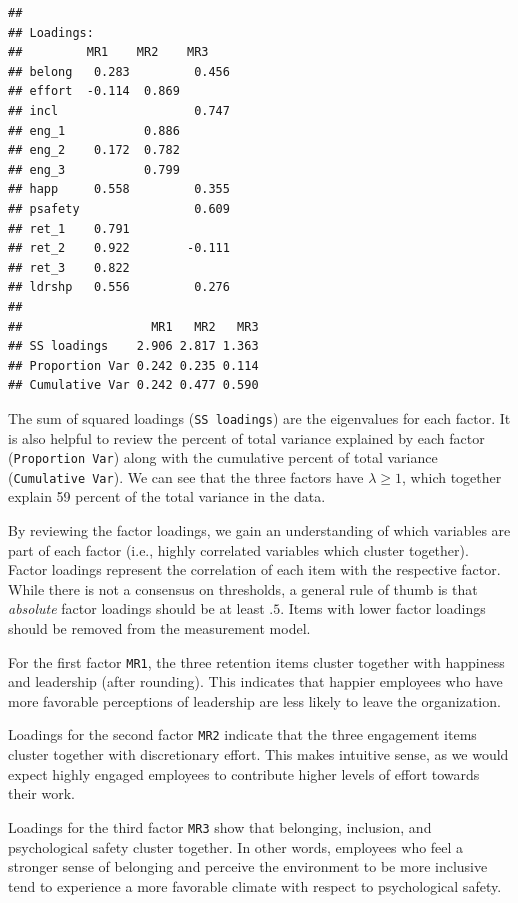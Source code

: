 \documentclass[
]{book}
\begin{document}
\begin{verbatim}
## 
## Loadings:
##         MR1    MR2    MR3   
## belong   0.283         0.456
## effort  -0.114  0.869       
## incl                   0.747
## eng_1           0.886       
## eng_2    0.172  0.782       
## eng_3           0.799       
## happ     0.558         0.355
## psafety                0.609
## ret_1    0.791              
## ret_2    0.922        -0.111
## ret_3    0.822              
## ldrshp   0.556         0.276
## 
##                  MR1   MR2   MR3
## SS loadings    2.906 2.817 1.363
## Proportion Var 0.242 0.235 0.114
## Cumulative Var 0.242 0.477 0.590
\end{verbatim}

The sum of squared loadings (\texttt{SS\ loadings}) are the eigenvalues for each factor. It is also helpful to review the percent of total variance explained by each factor (\texttt{Proportion\ Var}) along with the cumulative percent of total variance (\texttt{Cumulative\ Var}). We can see that the three factors have \(\lambda \ge 1\), which together explain 59 percent of the total variance in the data.

By reviewing the factor loadings, we gain an understanding of which variables are part of each factor (i.e., highly correlated variables which cluster together). Factor loadings represent the correlation of each item with the respective factor. While there is not a consensus on thresholds, a general rule of thumb is that \emph{absolute} factor loadings should be at least \(.5\). Items with lower factor loadings should be removed from the measurement model.

For the first factor \texttt{MR1}, the three retention items cluster together with happiness and leadership (after rounding). This indicates that happier employees who have more favorable perceptions of leadership are less likely to leave the organization.

Loadings for the second factor \texttt{MR2} indicate that the three engagement items cluster together with discretionary effort. This makes intuitive sense, as we would expect highly engaged employees to contribute higher levels of effort towards their work.

Loadings for the third factor \texttt{MR3} show that belonging, inclusion, and psychological safety cluster together. In other words, employees who feel a stronger sense of belonging and perceive the environment to be more inclusive tend to experience a more favorable climate with respect to psychological safety.
\end{document}
